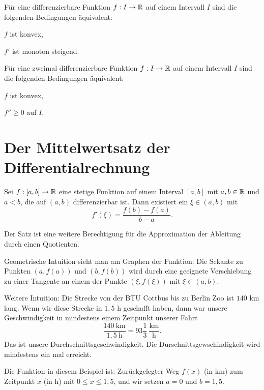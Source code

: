 \begin{thm} Für eine differenzierbare Funktion $f : I \to \mathbb{R}$  auf einem Intervall $I$ sind die folgenden Bedingungen äquivalent: 
	\begin{enumi}
		\item $f$ ist konvex,
		\item $f'$ ist monoton steigend. 
	\end{enumi}
\end{thm} 

\begin{thm} Für eine zweimal differenzierbare Funktion $f : I \to \mathbb{R}$ auf einem Intervall $I$ sind die folgenden Bedingungen äquivalent: 
	\begin{enumi} 
		\item $f$ ist konvex, 
		\item $f'' \ge 0$ auf $I$.
	\end{enumi} 
\end{thm} 

\section{Der Mittelwertsatz der Differentialrechnung} 

\begin{thm}
	Sei $f: [a,b] \to \mathbb{R}$ eine stetige Funktion auf einem Interval $[a,b]$ mit $a,b \in \mathbb{R}$ und $a<b$, die auf $(a,b)$ differenzierbar ist. Dann existiert ein $\xi \in (a,b)$ mit 
	\[
		f'(\xi) = \frac{f(b) - f(a)}{b-a}. 
	\]
\end{thm} 

\begin{bem}
	Der Satz ist eine weitere Berechtigung für die Approximation der Ableitung durch einen Quotienten.
\end{bem} 

\begin{bem} 
	Geometrische Intuition sieht man am Graphen der Funktion: Die Sekante zu Punkten $(a,f(a))$ und $(b,f(b))$ wird durch eine geeignete Verschiebung zu einer Tangente an einem der Punkte $(\xi,f(\xi))$ mit $\xi \in (a,b)$. 
\end{bem} 


\begin{bem} 
	Weitere Intuition: Die Strecke von der BTU Cottbus bis zu Berlin Zoo ist $140$ km lang. Wenn wir diese Strecke in $1{,}5$ h geschafft haben, dann war unsere Geschwindigkeit in mindestens einem Zeitpunkt unserer Fahrt 
	\[
		\frac{140 \ \text{km} }{1{,}5 \ \text{h}} = 93 \frac{1}{3} \ \frac{\text{km}}{\text{h}}.
	\] 
	Das ist unsere Durchschnittsgeschwindigkeit. Die Durschnittsgewschindigkeit wird mindestens ein mal erreicht. 
	
	Die Funktion in diesem Beispiel ist: Zurückgelegter Weg $f(x)$ (in km) zum Zeitpunkt $x$ (in h) mit $0 \le x \le 1{,}5$, und wir setzen $a=0$ und $b=1{,}5$. 
\end{bem} 

